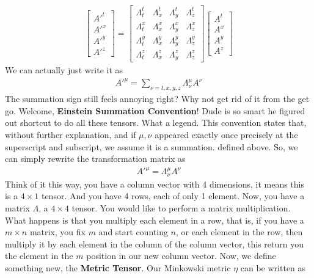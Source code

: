 \documentclass[12pt]{book}
\newcommand{\etensor}[3]{#1_{#3}^{#2}}
\begin{document}
\begin{align}
\begin{bmatrix}
    A'^t \\
    A'^x \\
    A'^y \\
    A'^z
\end{bmatrix}
=
\begin{bmatrix}
    \Lambda^t_t & \Lambda^t_x & \Lambda^t_y & \Lambda^t_z \\
    \Lambda^x_t & \Lambda^x_x & \Lambda^x_y & \Lambda^x_z \\
    \Lambda^y_t & \Lambda^y_x & \Lambda^y_y & \Lambda^y_z \\
    \Lambda^z_t & \Lambda^z_x & \Lambda^z_y & \Lambda^z_z
\end{bmatrix}
\begin{bmatrix}
    A^t \\
    A^x \\
    A^y \\
    A^z
\end{bmatrix}
\end{align}
We can actually just write it as
\begin{align}
A'^{\mu} = \sum_{\nu=t,x,y,z} \etensor{\Lambda}{\mu}{\nu}A^\nu
\end{align}
The summation sign still feels annoying right? Why not get rid of it from the get go. Welcome, \textbf{Einstein Summation Convention}! Dude is so smart he figured out shortcut to do all these tensors. What a legend. This convention states that, without further explanation, and if $\mu,\nu$ appeared exactly once precisely at the superscript and subscript, we assume it is a summation. defined above. So, we can simply rewrite the transformation matrix as
\begin{align}
A'^{\mu} = \etensor{\Lambda}{\mu}{\nu}A^\nu
\end{align}
Think of it this way, you have a column vector with 4 dimensions, it means this is a $4\times 1$ tensor. And you have 4 rows, each of only 1 element. Now, you have a matrix $\Lambda$, a $4\times 4$ tensor. You would like to perform a matrix multiplication. What happens is that you multiply each element in a row, that is, if you have a $m\times n$ matrix, you fix $m$ and start counting $n$, or each element in the row, then multiply it by each element in the column of the column vector, this return you the element in the $m$ position in our new column vector.
Now, we define something new, the \textbf{Metric Tensor}. Our Minkowski metric $\eta$ can be written as
\end{document}
